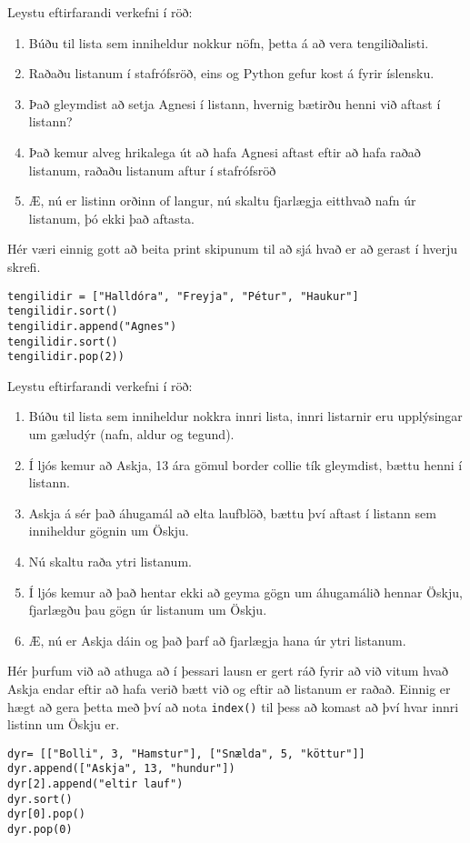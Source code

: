 \begin{exercise}\label{lst6}
Leystu eftirfarandi verkefni í röð:
\begin{enumerate}
	\item Búðu til lista sem inniheldur nokkur nöfn, þetta á að vera tengiliðalisti.
	\item Raðaðu listanum í stafrófsröð, eins og Python gefur kost á fyrir íslensku.
	\item Það gleymdist að setja Agnesi í listann, hvernig bætirðu henni við aftast í listann?
	\item Það kemur alveg hrikalega út að hafa Agnesi aftast eftir að hafa raðað listanum, raðaðu listanum aftur í stafrófsröð
	\item Æ, nú er listinn orðinn of langur, nú skaltu fjarlægja eitthvað nafn úr listanum, þó ekki það aftasta.
\end{enumerate}
\end{exercise}
\begin{Answer}[ref={lst6}]
Hér væri einnig gott að beita print skipunum til að sjá hvað er að gerast í hverju skrefi.
\begin{lstlisting}
tengilidir = ["Halldóra", "Freyja", "Pétur", "Haukur"]
tengilidir.sort()
tengilidir.append("Agnes")
tengilidir.sort()
tengilidir.pop(2))\end{lstlisting}
\end{Answer}

\begin{exercise}\label{lst7}
Leystu eftirfarandi verkefni í röð:
\begin{enumerate}
	\item Búðu til lista sem inniheldur nokkra innri lista, innri listarnir eru upplýsingar um gæludýr (nafn, aldur og tegund).
	\item Í ljós kemur að Askja, 13 ára gömul border collie tík gleymdist, bættu henni í listann.
	\item Askja á sér það áhugamál að elta laufblöð, bættu því aftast í listann sem inniheldur gögnin um Öskju.
	\item Nú skaltu raða ytri listanum.
	\item Í ljós kemur að það hentar ekki að geyma gögn um áhugamálið hennar Öskju, fjarlægðu þau gögn úr listanum um Öskju.
	\item Æ, nú er Askja dáin og það þarf að fjarlægja hana úr ytri listanum.
\end{enumerate}
\end{exercise}
\begin{Answer}[ref={lst7}]
Hér þurfum við að athuga að í þessari lausn er gert ráð fyrir að við vitum hvað Askja endar eftir að hafa verið bætt við og eftir að listanum er raðað.
Einnig er hægt að gera þetta með því að nota \texttt{index()} til þess að komast að því hvar innri listinn um Öskju er.
\begin{lstlisting}
dyr= [["Bolli", 3, "Hamstur"], ["Snælda", 5, "köttur"]]
dyr.append(["Askja", 13, "hundur"])
dyr[2].append("eltir lauf") 
dyr.sort()
dyr[0].pop()
dyr.pop(0)\end{lstlisting}
\end{Answer}